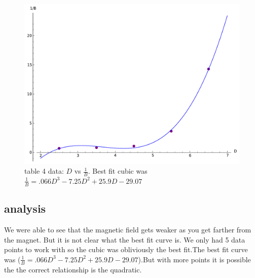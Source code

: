 \documentclass[12pt]{article}
\begin{document}
	\begin{figure}[hp]
	 \centering
	 \includegraphics[scale = .85]{plot4}
	 \caption*{table 4 data: $D$ vs $\frac{1}{B}$. Best fit cubic was $ \frac{1}{B} = .066D^3  - 7.25D^2 + 25.9D - 29.07 $}
	\end{figure} 
	\FloatBarrier

\subsection*{analysis}
 We were able to see that the magnetic field gets weaker as you get farther from the magnet. But it is not clear what the best fit curve is. We only had 5 data points to work with so the cubic was obliviously the best fit.The best fit curve was  ($\frac{1}{B} = .066D^3  - 7.25D^2 + 25.9D - 29.07$).But with more points it is possible the the correct relationship is the quadratic.    
\end{document}
